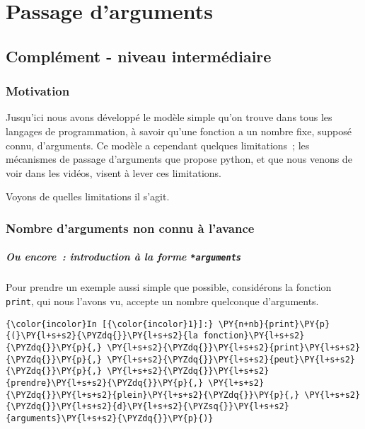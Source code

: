     
    
    
    

    

    \hypertarget{passage-darguments}{%
\section{Passage d'arguments}\label{passage-darguments}}

    \hypertarget{compluxe9ment---niveau-intermuxe9diaire}{%
\subsection{Complément - niveau
intermédiaire}\label{compluxe9ment---niveau-intermuxe9diaire}}

    \hypertarget{motivation}{%
\subsubsection{Motivation}\label{motivation}}

    Jusqu'ici nous avons développé le modèle simple qu'on trouve dans tous
les langages de programmation, à savoir qu'une fonction a un nombre
fixe, supposé connu, d'arguments. Ce modèle a cependant quelques
limitations~; les mécanismes de passage d'arguments que propose python,
et que nous venons de voir dans les vidéos, visent à lever ces
limitations.

Voyons de quelles limitations il s'agit.

    \hypertarget{nombre-darguments-non-connu-uxe0-lavance}{%
\subsubsection{Nombre d'arguments non connu à
l'avance}\label{nombre-darguments-non-connu-uxe0-lavance}}

    \hypertarget{ou-encore-introduction-uxe0-la-forme-arguments}{%
\subparagraph{\texorpdfstring{Ou encore~: introduction à la forme
\texttt{*arguments}}{Ou encore~: introduction à la forme *arguments}}\label{ou-encore-introduction-uxe0-la-forme-arguments}}

    Pour prendre un exemple aussi simple que possible, considérons la
fonction \texttt{print}, qui nous l'avons vu, accepte un nombre
quelconque d'arguments.

    \begin{Verbatim}[commandchars=\\\{\}]
{\color{incolor}In [{\color{incolor}1}]:} \PY{n+nb}{print}\PY{p}{(}\PY{l+s+s2}{\PYZdq{}}\PY{l+s+s2}{la fonction}\PY{l+s+s2}{\PYZdq{}}\PY{p}{,} \PY{l+s+s2}{\PYZdq{}}\PY{l+s+s2}{print}\PY{l+s+s2}{\PYZdq{}}\PY{p}{,} \PY{l+s+s2}{\PYZdq{}}\PY{l+s+s2}{peut}\PY{l+s+s2}{\PYZdq{}}\PY{p}{,} \PY{l+s+s2}{\PYZdq{}}\PY{l+s+s2}{prendre}\PY{l+s+s2}{\PYZdq{}}\PY{p}{,} \PY{l+s+s2}{\PYZdq{}}\PY{l+s+s2}{plein}\PY{l+s+s2}{\PYZdq{}}\PY{p}{,} \PY{l+s+s2}{\PYZdq{}}\PY{l+s+s2}{d}\PY{l+s+s2}{\PYZsq{}}\PY{l+s+s2}{arguments}\PY{l+s+s2}{\PYZdq{}}\PY{p}{)}
\end{Verbatim}


